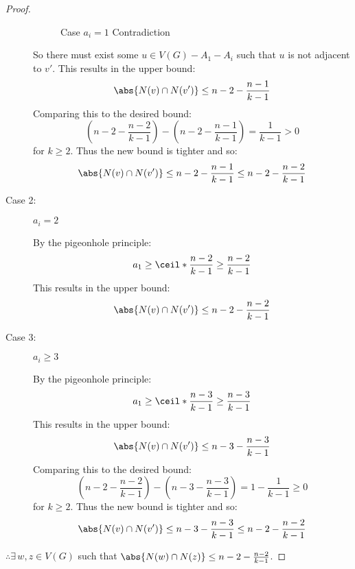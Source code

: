 \begin{proof}
\begin{description}
    \begin{figure}[h]
      \label{fig:aione}
      \begin{center}
      \end{center}
      \caption{Case \(a_i=1\) Contradiction}
    \end{figure}

    So there must exist some \(u\in V(G)-A_1-A_i\) such that \(u\) is not adjacent to \(v'\).  This results in the
    upper bound:
    \[\abs{N(v)\cap N(v')}\le n-2-\frac{n-1}{k-1}\]
    Comparing this to the desired bound:
    \[\left(n-2-\frac{n-2}{k-1}\right)-\left(n-2-\frac{n-1}{k-1}\right)=\frac{1}{k-1}>0\]
    for \(k\ge2\).  Thus the new bound is tighter and so:
    \[\abs{N(v)\cap N(v')}\le n-2-\frac{n-1}{k-1}\le n-2-\frac{n-2}{k-1}\]
    
  \item [Case 2:] \(a_i=2\)

    By the pigeonhole principle:
    \[a_1\ge\ceil*{\frac{n-2}{k-1}}\ge\frac{n-2}{k-1}\]
    This results in the upper bound:
    \[\abs{N(v)\cap N(v')}\le n-2-\frac{n-2}{k-1}\]
    
  \item [Case 3:] \(a_i\ge3\)

    By the pigeonhole principle:
    \[a_1\ge\ceil*{\frac{n-3}{k-1}}\ge\frac{n-3}{k-1}\]
    This results in the upper bound:
    \[\abs{N(v)\cap N(v')}\le n-3-\frac{n-3}{k-1}\]
    Comparing this to the desired bound:
    \[\left(n-2-\frac{n-2}{k-1}\right)-\left(n-3-\frac{n-3}{k-1}\right)=1-\frac{1}{k-1}\ge0\]
    for \(k\ge2\).  Thus the new bound is tighter and so:
    \[\abs{N(v)\cap N(v')}\le n-3-\frac{n-3}{k-1}\le n-2-\frac{n-2}{k-1}\]
  \end{description}

  \(\displaystyle \therefore\exists\,w,z\in V(G)\) such that \(\abs{N(w)\cap N(z)}\le n-2-\frac{n-2}{k-1}\).
\end{proof}

